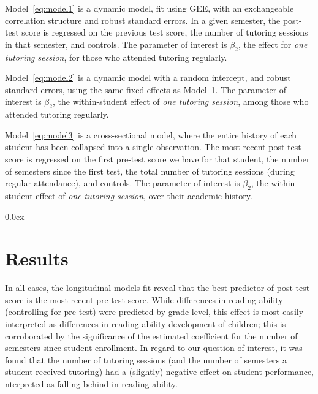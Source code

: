\documentclass[a0,landscape]{a0poster}
\begin{document}
\begin{multicols}{3}
Model~\ref{eq:model1} is a dynamic model, fit using GEE,
with an exchangeable correlation structure and
robust standard errors.
In a given semester, the post-test score is regressed
on the previous test score,
the number of tutoring sessions in that semester,
and controls.
The parameter of interest is $\beta_2$, the
effect for \textit{one tutoring session},
for those who attended tutoring regularly.

Model~\ref{eq:model2} is a dynamic model with a random intercept,
and robust standard errors, using the same
fixed effects as Model~1.
The parameter of interest is $\beta_2$, the
within-student effect of \textit{one tutoring session},
among those who attended tutoring regularly.

Model~\ref{eq:model3} is a cross-sectional model, where the
entire history of each student has been collapsed into a
single observation.
The most recent post-test score is regressed on
the first pre-test score we have for that student,
the number of semesters since the first test,
the total number of tutoring sessions (during regular attendance),
and controls.
The parameter of interest is $\beta_2$, the
within-student effect of \textit{one tutoring session},
over their academic history.




\color{NavyBlue}
\parskip 0.0ex
\section*{Results}
%
\color{Black}
\begin{center}\vspace{1cm}

\end{center}\vspace{0.5cm}
\color{NavyBlue}
%   
In all cases, the longitudinal models fit reveal that
the best predictor of post-test score is the most recent
pre-test score.
While differences in reading ability (controlling for pre-test)
were predicted by grade level, this effect is most easily
interpreted as differences in reading ability development
of children; this is corroborated by the significance of the
estimated coefficient for the number of semesters since
student enrollment.
In regard to our question of interest, it was found that the
number of tutoring sessions
(and the number of semesters a student received tutoring)
had a (slightly) negative effect on student performance, 
nterpreted as falling behind in reading ability. 


\end{multicols}
\end{document}
